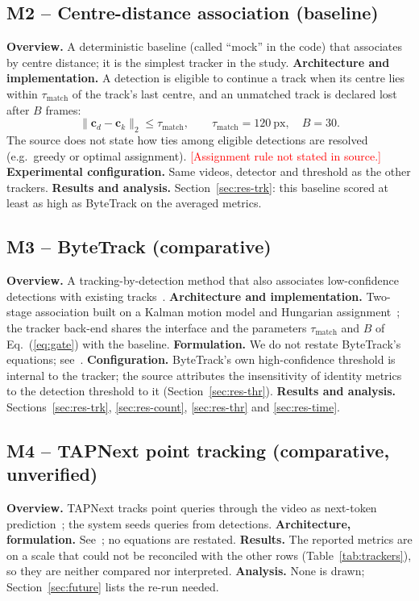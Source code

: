 \documentclass[11pt,a4paper]{article}
\newcommand{\todo}[1]{\textcolor{red}{[#1]}}
\begin{document}
\subsection{M2 -- Centre-distance association (baseline)}
\textbf{Overview.} A deterministic baseline (called ``mock'' in the code) that associates by centre distance; it is the simplest tracker in the study. \textbf{Architecture and implementation.} A detection is eligible to continue a track when its centre lies within $\tau_{\mathrm{match}}$ of the track's last centre, and an unmatched track is declared lost after $B$ frames:
\begin{equation}
\lVert \mathbf{c}_d-\mathbf{c}_k\rVert_2\le\tau_{\mathrm{match}},\qquad \tau_{\mathrm{match}}=120\ \text{px},\quad B=30 .\label{eq:gate}
\end{equation}
The source does not state how ties among eligible detections are resolved (e.g.\ greedy or optimal assignment). \todo{Assignment rule not stated in source.} \textbf{Experimental configuration.} Same videos, detector and threshold as the other trackers. \textbf{Results and analysis.} Section~\ref{sec:res-trk}: this baseline scored at least as high as ByteTrack on the averaged metrics.

\subsection{M3 -- ByteTrack (comparative)}
\textbf{Overview.} A tracking-by-detection method that also associates low-confidence detections with existing tracks~\cite{zhang2022bytetrack}. \textbf{Architecture and implementation.} Two-stage association built on a Kalman motion model and Hungarian assignment~\cite{kalman1960,kuhn1955}; the tracker back-end shares the interface and the parameters $\tau_{\mathrm{match}}$ and $B$ of Eq.~(\ref{eq:gate}) with the baseline. \textbf{Formulation.} We do not restate ByteTrack's equations; see~\cite{zhang2022bytetrack}. \textbf{Configuration.} ByteTrack's own high-confidence threshold is internal to the tracker; the source attributes the insensitivity of identity metrics to the detection threshold to it (Section~\ref{sec:res-thr}). \textbf{Results and analysis.} Sections~\ref{sec:res-trk}, \ref{sec:res-count}, \ref{sec:res-thr} and \ref{sec:res-time}.

\subsection{M4 -- TAPNext point tracking (comparative, unverified)}
\textbf{Overview.} TAPNext tracks point queries through the video as next-token prediction~\cite{zholus2025tapnext}; the system seeds queries from detections. \textbf{Architecture, formulation.} See~\cite{zholus2025tapnext}; no equations are restated. \textbf{Results.} The reported metrics are on a scale that could not be reconciled with the other rows (Table~\ref{tab:trackers}), so they are neither compared nor interpreted. \textbf{Analysis.} None is drawn; Section~\ref{sec:future} lists the re-run needed.
\end{document}
